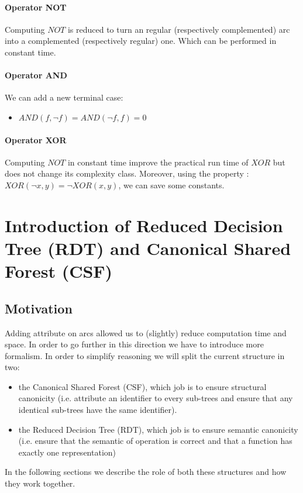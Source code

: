 \documentclass[a4paper,10pt]{article}
\begin{document}
\paragraph{Operator NOT}
Computing $NOT$ is reduced to turn an regular (respectively complemented) arc into a complemented (respectively regular) one.
Which can be performed in constant time.

\paragraph{Operator AND}
We can add a new terminal case:\begin{itemize}
\item $AND(f, \lnot f) = AND(\lnot f, f) = 0$
\end{itemize}

\paragraph{Operator XOR}
Computing $NOT$ in constant time improve the practical run time of $XOR$ but does not change its complexity class.
Moreover, using the property : $XOR(\lnot x, y) = \lnot XOR(x, y)$, we can save some constants.


\section{Introduction of Reduced Decision Tree (RDT) and Canonical Shared Forest (CSF)}
\subsection{Motivation}
Adding attribute on arcs allowed us to (slightly) reduce computation time and space.
In order to go further in this direction we have to introduce more formalism.
In order to simplify reasoning we will split the current structure in two:\begin{itemize}
\item the Canonical Shared Forest (CSF), which job is to ensure structural canonicity (i.e. attribute an identifier to every sub-trees and ensure that any identical sub-trees have the same identifier).
\item the Reduced Decision Tree (RDT), which job is to ensure semantic canonicity (i.e. ensure that the semantic of operation is correct and that a function has exactly one representation)
\end{itemize}
In the following sections we describe the role of both these structures and how they work together.
\end{document}
